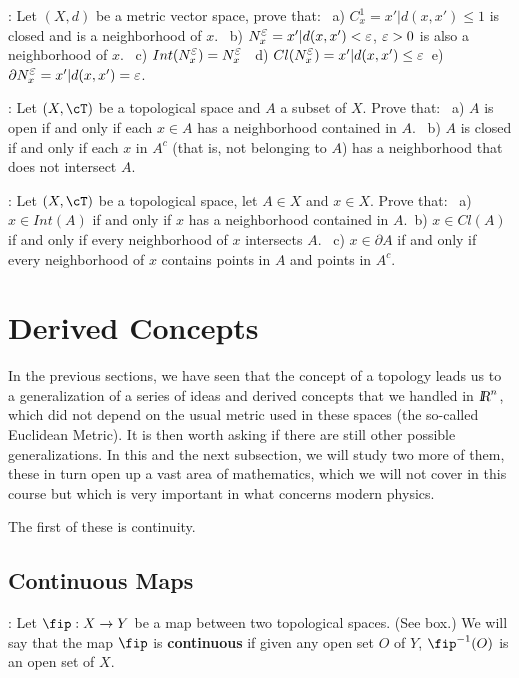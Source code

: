 \ejer: Let $(X,d)$ be a metric vector space, prove that: \ a) $C^1_x = {x'| d(x,x') \leq 1 }$ is closed and is a neighborhood of $x$. \ b) $N^{\mbox{$\varepsilon$}}_x ={x' | d(x,x') < \mbox{$\varepsilon$} }$, $\mbox{$\varepsilon$} >0$ is also a neighborhood of $x$. \ c) $Int(N^{\mbox{$\varepsilon$}}_x) = N^{\mbox{$\varepsilon$}}_x$ \ d) $Cl(N^{\mbox{$\varepsilon$}}_x) = {x' | d(x,x') \leq \mbox{$\varepsilon$}} $\ e) $\partial N^{\mbox{$\varepsilon$}}_x = {x' | d(x,x') = \mbox{$\varepsilon$} }$.

\ejer: Let $(X,\cT)$ be a topological space and $A$ a subset of $X$. Prove that: \ a) $A$ is open if and only if each $x \in A$ has a neighborhood contained in $A$. \ b) $A$ is closed if and only if each $x$ in $A^c$ (that is, not belonging to $A$) has a neighborhood that does not intersect $A$.

\ejer: Let $(X,\cT)$ be a topological space, let $A \in X$ and $x \in X$. Prove that: \ a) $x \in Int(A)$ if and only if $x$ has a neighborhood contained in $A$.\ b) $x \in Cl(A)$ if and only if every neighborhood of $x$ intersects $A$. \ c) $x \in \partial A$ if and only if every neighborhood of $x$ contains points in $A$ and points in $A^c$.

\section{Derived Concepts}

In the previous sections, we have seen that the concept of a topology leads us to a generalization of a series of ideas and derived concepts that we handled in $\mbox{\sl {l$\!\!\!\;\:\!$R}}^n$, which did not depend on the usual metric used in these spaces (the so-called Euclidean Metric). It is then worth asking if there are still other possible generalizations. In this and the next subsection, we will study two more of them, these in turn open up a vast area of mathematics, which we will not cover in this course but which is very important in what concerns modern physics.

The first of these is continuity.

\subsection{Continuous Maps}

: Let $\fip :X \rightarrow Y$ be a map between two topological spaces. (See box.) We will say that the map $\fip$ is {\bf continuous} if given any open set $O$ of $Y$, $\fip^{-1}(O)$ is an open set of $X$.

\espa %

